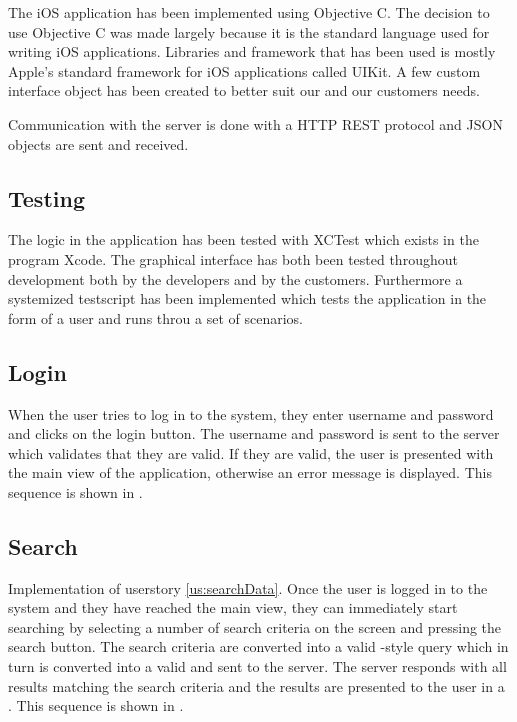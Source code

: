 The iOS application has been implemented using Objective C. The decision to use Objective C was made largely because it is the standard language used for writing iOS applications. Libraries and framework that has been used is mostly Apple's standard framework for iOS applications called UIKit. A few custom interface object has been created to better suit our and our customers needs. 

Communication with the server is done with a HTTP REST protocol and JSON objects are sent and received. 

\subsection{Testing}
The logic in the application has been tested with XCTest which exists in the program Xcode. 
The graphical interface has both been tested throughout development both by the developers and by the customers. Furthermore a systemized testscript has been implemented which tests the application in the form of a user and runs throu a set of scenarios.  

\iffalse
\subsection{Login}

When the user tries to log in to the system, they enter username and password and clicks on the login button. The username and password is sent to the server which validates that they are valid. If they are valid, the user is presented with the main view of the application, otherwise an error message is displayed. This sequence is shown in .


\subsection{Search}
Implementation of userstory \ref{us:searchData}. Once the user is logged in to the system and they have reached the main view, they can immediately start searching by selecting a number of search criteria on the screen and pressing the search button. The search criteria are converted into a valid -style query which in turn is converted into a valid  and sent to the server. The server responds with all results matching the search criteria and the results are presented to the user in a . This sequence is shown in .


